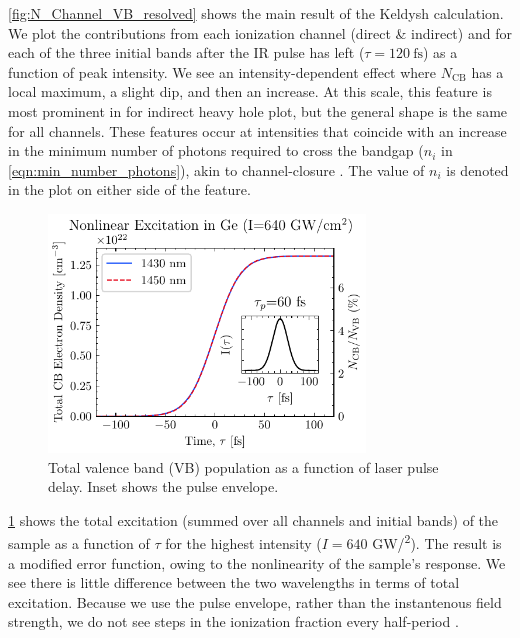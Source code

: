 \cref{fig:N_Channel_VB_resolved} shows the main result of the Keldysh calculation. We plot the contributions from each ionization channel (direct \& indirect) and for each of the three initial bands after the IR pulse has left ($\tau = 120 \ \textrm{fs}$) as a function of peak intensity. We see an intensity-dependent effect where $N_{\textrm{CB}}$ has a local maximum, a slight dip, and then an increase. At this scale, this feature is most prominent in for indirect heavy hole plot, but the general shape is the same for all channels. These features occur at intensities that coincide with an increase in the minimum number of photons required to cross the bandgap ($n_i$ in \cref{eqn:min_number_photons}), akin to channel-closure \cite{shcheblanovNonlinearPhotoionizationTransparent2017}. The value of $n_i$ is denoted in the plot on either side of the feature.

\begin{figure}
	\centering
	\includegraphics[width=0.75\textwidth]{figures/chap4/Total_CB_dens_vs_Time.pdf}
	\caption{Total valence band (VB) population as a function of laser pulse delay. Inset shows the pulse envelope.}
	\label{fig:Total_CB_dens_vs_Time}
\end{figure}

\cref{fig:Total_CB_dens_vs_Time} shows the total excitation (summed over all channels and initial bands) of the sample as a function of $\tau$ for the highest intensity ($I = 640$ GW/\textsuperscript{2}). The result is a modified error function, owing to the nonlinearity of the sample's response. We see there is little difference between the two wavelengths in terms of total excitation. Because we use the pulse envelope, rather than the instantenous field strength, we do not see steps in the ionization fraction every half-period \cite{schultzeAttosecondBandgapDynamics2014}.

